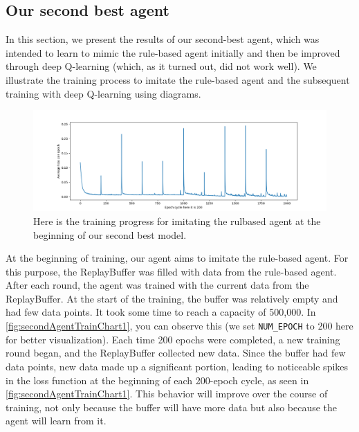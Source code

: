\newpage
{}

\subsection{Our second best agent}

In this section, we present the results of our second-best agent, which was intended to learn to mimic the rule-based agent initially and 
then be improved through deep Q-learning (which, as it turned out, did not work well). We illustrate the training process to imitate the rule-based 
agent and the subsequent training with deep Q-learning using diagrams.

\begin{figure}[H]
    \centering
    
    \includegraphics[width=\oneImgWidth]{images/secondAgentTrainChart1}%
    
    \captionadjust%
    \caption{\label{fig:secondAgentTrainChart1} Here is  the training progress for imitating the rulbased agent at the beginning of our second best model.
    }%
\end{figure}

At the beginning of training, our agent aims to imitate the rule-based agent. For this purpose, the ReplayBuffer was filled with data 
from the rule-based agent. After each round, the agent was trained with the current data from the ReplayBuffer. At the start of the training, 
the buffer was relatively empty and had few data points. It took some time to reach a capacity of 500,000. In \autoref{fig:secondAgentTrainChart1}, you can observe 
this (we set \verb|NUM_EPOCH| to 200 here for better visualization). Each time 200 epochs were completed, a new training round began, and the 
ReplayBuffer collected new data. Since the buffer had few data points, new data made up a significant portion, leading to noticeable spikes 
in the loss function at the beginning of each 200-epoch cycle, as seen in \autoref{fig:secondAgentTrainChart1}. This behavior will improve over the course of training, not 
only because the buffer will have more data but also because the agent will learn from it.

